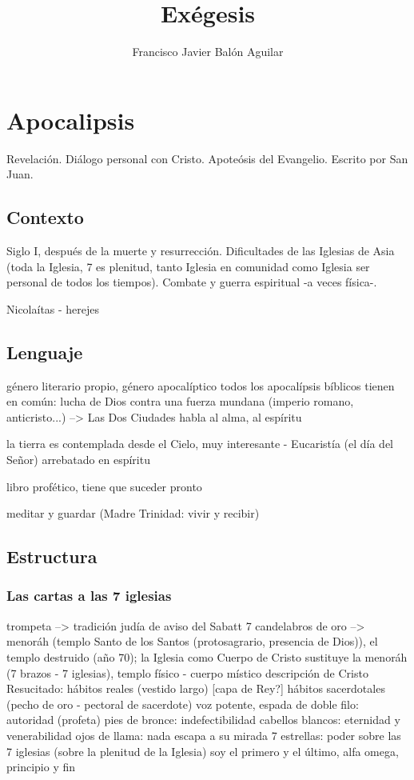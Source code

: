 \documentclass[11pt, oneside, titlepage]{book}
\title{\textbf{Exégesis}}
\author{Francisco Javier Balón Aguilar}
\begin{document}
\maketitle
\tableofcontents
\newpage

\chapter{Apocalipsis}

    Revelación.
    Diálogo personal con Cristo.
    Apoteósis del Evangelio.
    Escrito por San Juan.

    \section{Contexto}
    Siglo I, después de la muerte y resurrección. Dificultades de las Iglesias de Asia (toda la Iglesia, 7 es plenitud, tanto Iglesia en comunidad como Iglesia ser personal de todos los tiempos).
    Combate y guerra espiritual -a veces física-. 

    Nicolaítas - herejes

    \section{Lenguaje}
    género literario propio, género apocalíptico
    todos los apocalípsis bíblicos tienen en común: lucha de Dios contra una fuerza mundana (imperio romano, anticristo...) --> Las Dos Ciudades
    habla al alma, al espíritu

    la tierra es contemplada desde el Cielo, muy interesante - Eucaristía (el día del Señor) arrebatado en espíritu

    libro profético, tiene que suceder pronto

    meditar y guardar (Madre Trinidad: vivir y recibir)

    \section{Estructura}

    \subsection{Las cartas a las 7 iglesias}

        trompeta --> tradición judía de aviso del Sabatt
        7 candelabros de oro --> menoráh (templo Santo de los Santos (protosagrario, presencia de Dios)), el templo destruido (año 70); la Iglesia como Cuerpo de Cristo sustituye la menoráh (7 brazos - 7 iglesias), templo físico - cuerpo místico
        descripción de Cristo Resucitado:
            hábitos reales (vestido largo) [capa de Rey?]
            hábitos sacerdotales (pecho de oro - pectoral de sacerdote)
            voz potente, espada de doble filo: autoridad (profeta)
            pies de bronce: indefectibilidad
            cabellos blancos: eternidad y venerabilidad
            ojos de llama: nada escapa a su mirada
            7 estrellas: poder sobre las 7 iglesias (sobre la plenitud de la Iglesia)
        soy el primero y el último, alfa omega, principio y fin
\end{document}
